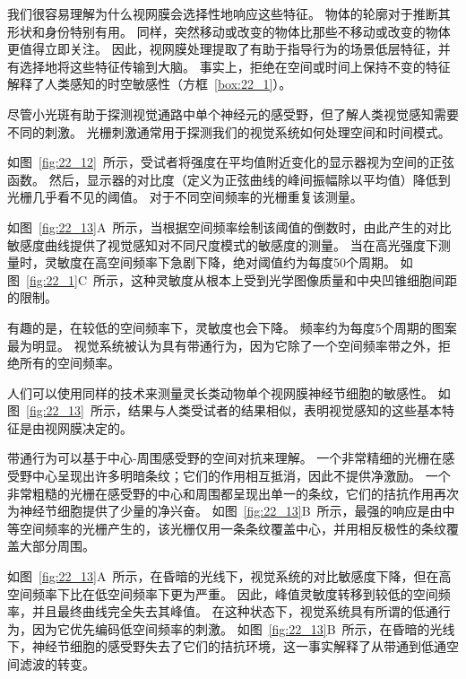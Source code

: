 我们很容易理解为什么视网膜会选择性地响应这些特征。 
物体的轮廓对于推断其形状和身份特别有用。
同样，突然移动或改变的物体比那些不移动或改变的物体更值得立即关注。
因此，视网膜处理提取了有助于指导行为的场景低层特征，并有选择地将这些特征传输到大脑。
事实上，拒绝在空间或时间上保持不变的特征解释了人类感知的时空敏感性（方框~\ref{box:22_1}）。


\begin{proposition}[人类感知的时空敏感性] \label{box:22_1}
	
	\quad \quad 尽管小光斑有助于探测视觉通路中单个神经元的感受野，但了解人类视觉感知需要不同的刺激。
	光栅刺激通常用于探测我们的视觉系统如何处理空间和时间模式。
	
	\quad \quad 如图~\ref{fig:22_12}~所示，受试者将强度在平均值附近变化的显示器视为空间的正弦函数。
	然后，显示器的对比度（定义为正弦曲线的峰间振幅除以平均值）降低到光栅几乎看不见的阈值。
	对于不同空间频率的光栅重复该测量。
	
	\quad \quad 如图~\ref{fig:22_13}A~所示，当根据空间频率绘制该阈值的倒数时，由此产生的对比敏感度曲线提供了视觉感知对不同尺度模式的敏感度的测量。
	当在高光强度下测量时，灵敏度在高空间频率下急剧下降，绝对阈值约为每度50个周期。
	如图~\ref{fig:22_1}C~所示，这种灵敏度从根本上受到光学图像质量和中央凹锥细胞间距的限制。
	
	\quad \quad 有趣的是，在较低的空间频率下，灵敏度也会下降。
	频率约为每度5个周期的图案最为明显。
	视觉系统被认为具有带通行为，因为它除了一个空间频率带之外，拒绝所有的空间频率。
	
	\quad \quad 人们可以使用同样的技术来测量灵长类动物单个视网膜神经节细胞的敏感性。
	如图~\ref{fig:22_13}~所示，结果与人类受试者的结果相似，表明视觉感知的这些基本特征是由视网膜决定的。
	
	\quad \quad 带通行为可以基于中心-周围感受野的空间对抗来理解。
	一个非常精细的光栅在感受野中心呈现出许多明暗条纹；它们的作用相互抵消，因此不提供净激励。
	一个非常粗糙的光栅在感受野的中心和周围都呈现出单一的条纹，它们的拮抗作用再次为神经节细胞提供了少量的净兴奋。
	如图~\ref{fig:22_13}B~所示，最强的响应是由中等空间频率的光栅产生的，该光栅仅用一条条纹覆盖中心，并用相反极性的条纹覆盖大部分周围。
	
	\quad \quad 如图~\ref{fig:22_13}A~所示，在昏暗的光线下，视觉系统的对比敏感度下降，但在高空间频率下比在低空间频率下更为严重。
	因此，峰值灵敏度转移到较低的空间频率，并且最终曲线完全失去其峰值。
	在这种状态下，视觉系统具有所谓的低通行为，因为它优先编码低空间频率的刺激。
	如图~\ref{fig:22_13}B~所示，在昏暗的光线下，神经节细胞的感受野失去了它们的拮抗环境，这一事实解释了从带通到低通空间滤波的转变。
	

\end{proposition}
